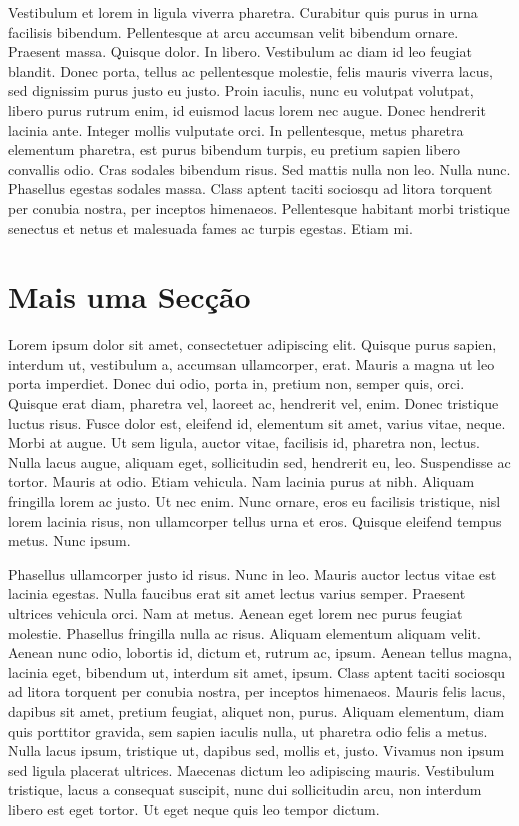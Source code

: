 Vestibulum et lorem in ligula viverra pharetra. Curabitur quis purus
in urna facilisis bibendum. Pellentesque at arcu accumsan velit
bibendum ornare. Praesent massa. Quisque dolor. In libero. Vestibulum
ac diam id leo feugiat blandit. Donec porta, tellus ac pellentesque
molestie, felis mauris viverra lacus, sed dignissim purus justo eu
justo. Proin iaculis, nunc eu volutpat volutpat, libero purus rutrum
enim, id euismod lacus lorem nec augue. Donec hendrerit lacinia
ante. Integer mollis vulputate orci. In pellentesque, metus pharetra
elementum pharetra, est purus bibendum turpis, eu pretium sapien
libero convallis odio. Cras sodales bibendum risus. Sed mattis nulla
non leo. Nulla nunc. Phasellus egestas sodales massa. Class aptent
taciti sociosqu ad litora torquent per conubia nostra, per inceptos
himenaeos. Pellentesque habitant morbi tristique senectus et netus et
malesuada fames ac turpis egestas. Etiam mi. 

\section{Mais uma Secção}

Lorem ipsum dolor sit amet, consectetuer adipiscing elit. Quisque
purus sapien, interdum ut, vestibulum a, accumsan ullamcorper,
erat. Mauris a magna ut leo porta imperdiet. Donec dui odio, porta in,
pretium non, semper quis, orci. Quisque erat diam, pharetra vel,
laoreet ac, hendrerit vel, enim. Donec tristique luctus risus. Fusce
dolor est, eleifend id, elementum sit amet, varius vitae, neque. Morbi
at augue. Ut sem ligula, auctor vitae, facilisis id, pharetra non,
lectus. Nulla lacus augue, aliquam eget, sollicitudin sed, hendrerit
eu, leo. Suspendisse ac tortor. Mauris at odio. Etiam vehicula. Nam
lacinia purus at nibh. Aliquam fringilla lorem ac justo. Ut nec
enim. Nunc ornare, eros eu facilisis tristique, nisl lorem lacinia
risus, non ullamcorper tellus urna et eros. Quisque eleifend tempus
metus. Nunc ipsum. 

Phasellus ullamcorper justo id risus. Nunc in leo. Mauris auctor
lectus vitae est lacinia egestas. Nulla faucibus erat sit amet lectus
varius semper. Praesent ultrices vehicula orci. Nam at metus. Aenean
eget lorem nec purus feugiat molestie. Phasellus fringilla nulla ac
risus. Aliquam elementum aliquam velit. Aenean nunc odio, lobortis id,
dictum et, rutrum ac, ipsum. Aenean tellus magna, lacinia eget,
bibendum ut, interdum sit amet, ipsum. Class aptent taciti sociosqu ad
litora torquent per conubia nostra, per inceptos himenaeos. Mauris
felis lacus, dapibus sit amet, pretium feugiat, aliquet non,
purus. Aliquam elementum, diam quis porttitor gravida, sem sapien
iaculis nulla, ut pharetra odio felis a metus. Nulla lacus ipsum,
tristique ut, dapibus sed, mollis et, justo. Vivamus non ipsum sed
ligula placerat ultrices. Maecenas dictum leo adipiscing
mauris. Vestibulum tristique, lacus a consequat suscipit, nunc dui
sollicitudin arcu, non interdum libero est eget tortor. Ut eget neque
quis leo tempor dictum. 

